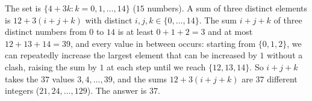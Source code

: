 The set is $\{4+3k: k=0,1,\dots,14\}$ ($15$ numbers). A sum of three distinct elements is $12+3(i+j+k)$ with distinct $i,j,k\in\{0,\dots,14\}$. The sum $i+j+k$ of three distinct numbers from $0$ to $14$ is at least $0+1+2=3$ and at most $12+13+14=39$, and every value in between occurs: starting from $\{0,1,2\}$, we can repeatedly increase the largest element that can be increased by $1$ without a clash, raising the sum by $1$ at each step until we reach $\{12,13,14\}$. So $i+j+k$ takes the $37$ values $3,4,\dots,39$, and the sums $12+3(i+j+k)$ are $37$ different integers ($21,24,\dots,129$). The answer is $\boxed{37}$.
